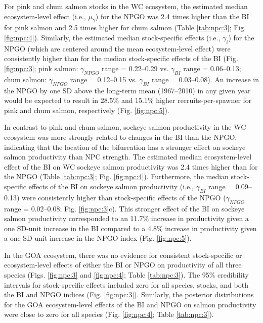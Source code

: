 For pink and chum salmon stocks in the WC ecosystem, the estimated median
ecosystem-level effect (i.e., \(\mu_{\gamma}\)) for the NPGO was 2.4 times
higher than the BI for pink salmon and 2.5 times higher for chum salmon (Table
\ref{tab:npc:3}; Fig. \ref{fig:npc:4}). Similarly, the estimated median
stock-specific effects (i.e., \(\gamma_i\)) for the NPGO (which are centered
around the mean ecosystem-level effect) were consistently higher than for the
median stock-specific effects of the BI (Fig. \ref{fig:npc:3}; pink salmon:
\(\gamma_{NPGO}\) range = 0.22--0.29 vs. \(\gamma_{BI}\) range = 0.06--0.13;
chum salmon: \(\gamma_{NPGO}\) range = 0.12--0.15 vs. \(\gamma_{BI}\) range =
0.03--0.08). An increase in the NPGO by one SD above the long-term mean
(1967--2010) in any given year would be expected to result in 28.5\% and 15.1\%
higher recruits-per-spawner for pink and chum salmon, respectively (Fig.
\ref{fig:npc:5}).

In contrast to pink and chum salmon, sockeye salmon productivity in the WC
ecosystem was more strongly related to changes in the BI than the NPGO,
indicating that the location of the bifurcation has a stronger effect on sockeye
salmon productivity than NPC strength. The estimated median ecosystem-level
effect of the BI on WC sockeye salmon productivity was 2.4 times higher than for
the NPGO (Table \ref{tab:npc:3}; Fig. \ref{fig:npc:4}). Furthermore, the median
stock-specific effects of the BI on sockeye salmon productivity (i.e.,
\(\gamma_{BI}\) range = 0.09--0.13) were consistently higher than stock-specific
effects of the NPGO (\(\gamma_{NPGO}\) range = 0.02--0.08; Fig.
\ref{fig:npc:3}c). This stronger effect of the BI on sockeye salmon productivity
corresponded to an 11.7\% increase in productivity given a one SD-unit increase
in the BI compared to a 4.8\% increase in productivity given a one SD-unit
increase in the NPGO index (Fig. \ref{fig:npc:5}).

In the GOA ecosystem, there was no evidence for consistent stock-specific or
ecosystem-level effects of either the BI or NPGO on productivity of all three
species (Figs. \ref{fig:npc:3} and \ref{fig:npc:4}; Table \ref{tab:npc:3}). The
95\% credibility intervals for stock-specific effects included zero for all
species, stocks, and both the BI and NPGO indices (Fig. \ref{fig:npc:3}).
Similarly, the posterior distributions for the GOA ecosystem-level effects of
the BI and NPGO on salmon productivity were close to zero for all species (Fig.
\ref{fig:npc:4}; Table \ref{tab:npc:3}).

